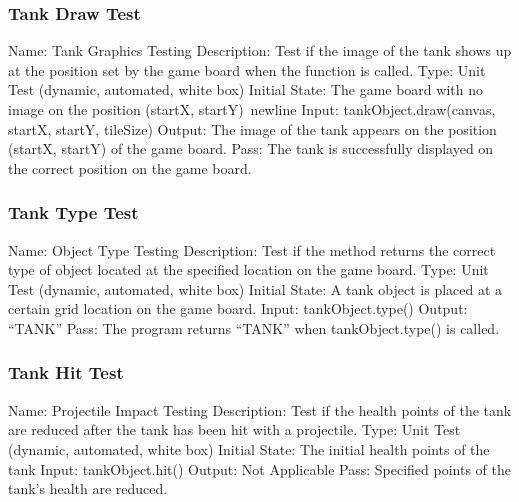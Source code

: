 \documentclass{article}
\begin{document}
\subsubsection{Tank Draw Test}
Name: Tank Graphics Testing\newline
Description: Test if the image of the tank shows up at the position set by the 
game board when the function is called.\newline
Type: Unit Test (dynamic, automated, white box)\newline
Initial State: The game board with no image on the position (startX, startY)
Input: tankObject.draw(canvas, startX, startY, tileSize)\newline
Output: The image of the tank appears on the position (startX, startY) of the 
game board.\newline
Pass: The tank is successfully displayed on the correct position on the game 
board.\newline

\subsubsection{Tank Type Test}
Name: Object Type Testing\newline
Description: Test if the method returns the correct type of object located at 
the specified location on the game board.\newline
Type: Unit Test (dynamic, automated, white box)\newline
Initial State: A tank object is placed at a certain grid location on the game 
board.\newline
Input: tankObject.type()\newline
Output: “TANK”\newline
Pass: The program returns “TANK” when tankObject.type() is called.\newline

\subsubsection{Tank Hit Test}
Name: Projectile Impact Testing\newline
Description: Test if the health points of the tank are reduced after the tank 
has been hit with a projectile.\newline
Type: Unit Test (dynamic, automated, white box)\newline
Initial State: The initial health points of the tank\newline
Input: tankObject.hit()\newline
Output: Not Applicable\newline
Pass: Specified points of the tank’s health are reduced.\newline
\end{document}

